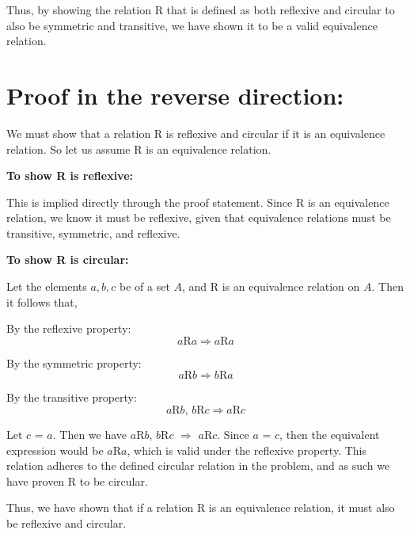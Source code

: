 \documentclass[12pt]{article}
\begin{document}
	Thus, by showing the relation R that is defined as both reflexive and circular to also be symmetric and transitive, we have shown it to be a valid equivalence relation.
	
	
	\section*{Proof in the reverse direction:}
	
	We must show that a relation R is reflexive and circular if it is an equivalence relation. So let us assume R is an equivalence relation.
	
	 
	 \bigskip
	 \textbf{To show R is reflexive:}
	 
	 This is implied directly through the proof statement. Since R is an equivalence relation, we know it must be reflexive, given that equivalence relations must be transitive, symmetric, and reflexive.
	 
	 \bigskip
	 \textbf{To show R is circular:}
	 
	 Let the elements $a,b,c$ be of a set $A$, and R is an equivalence relation on $A$. Then it follows that, 
	 
	 By the reflexive property:
	 $$ \text{$a$R$a$} \Rightarrow \text{$a$R$a$} $$
	 
	 By the symmetric property:
	 $$ \text{$a$R$b$} \Rightarrow \text{$b$R$a$} $$
	 
	 By the transitive property:
	 $$ \text{$a$R$b$, $b$R$c$} \Rightarrow \text{$a$R$c$} $$
	 	 
	Let $c$ = $a$. Then we have $a$R$b$, $b$R$c$ $\Rightarrow$ $a$R$c$. Since $a$ = $c$, then the equivalent expression would be $a$R$a$, which is valid under the reflexive property. This relation adheres to the defined circular relation in the problem, and as such we have proven R to be circular.
	
	
	\bigskip
	Thus, we have shown that if a relation R is an equivalence relation, it must also be reflexive and circular.
	
	
	
\end{document}

